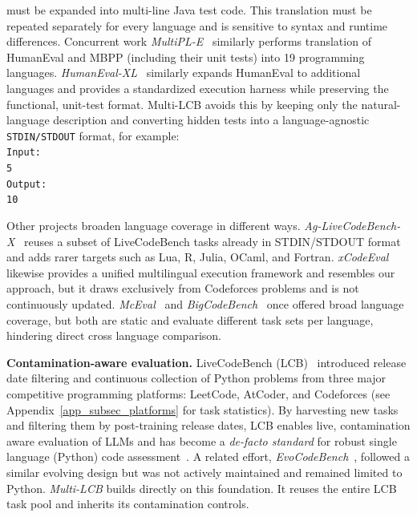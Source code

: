 \documentclass{article} %
\begin{document}
must be expanded into multi-line Java test code. This translation must be repeated separately for every language and is sensitive to syntax and runtime differences. Concurrent work \textit{MultiPL-E}~\citep{cassano2023multipl} similarly performs  translation of HumanEval and MBPP (including their unit tests) into 19 programming languages. \textit{HumanEval-XL}~\citep{peng2024humaneval} similarly expands HumanEval to additional languages and provides a standardized execution harness while preserving the functional, unit-test format. Multi-LCB avoids this by keeping only the natural-language description and converting hidden tests into a language-agnostic \texttt{STDIN/STDOUT}
 format, for example: \texttt{
\noindent{}\\
 \color{blue}Input:\\
\color{black}5\\
 \color{blue}Output:\\
\color{black}10}

Other projects broaden language coverage in different ways. \textit{Ag-LiveCodeBench-X}~\citep{boruch2025agnostics} reuses a subset of LiveCodeBench tasks already in STDIN/STDOUT format and adds rarer targets such as Lua, R, Julia, OCaml, and Fortran. 
\textit{xCodeEval}~\citep{khan2023xcodeeval} likewise provides a unified multilingual execution framework and resembles our approach, but it draws exclusively from Codeforces problems and is not continuously updated. 
\textit{McEval}~\citep{chai2024mceval} and \textit{BigCodeBench}~\citep{zhuo2024bigcodebench} once offered broad language coverage, but both are static and evaluate different task sets per language, hindering direct cross language comparison.


\textbf{Contamination-aware evaluation.} LiveCodeBench (LCB)~\citep{jain2024livecodebench} introduced release date filtering and continuous collection of Python problems from three major competitive programming platforms: LeetCode, AtCoder, and Codeforces (see Appendix~\ref{app_subsec_platforms} for task statistics).  
By harvesting new tasks and filtering them by post-training release dates, LCB enables live, contamination aware evaluation of LLMs and has become a \textit{de-facto standard} for robust single language (Python) code assessment~\citep{comanici2025gemini, yang2025qwen3, liu2024deepseek}. A related effort, \textit{EvoCodeBench}~\citep{li2024evocodebench}, followed a similar evolving design but was not actively maintained and remained limited to Python.
\textit{Multi-LCB} builds directly on this foundation. It reuses the entire LCB~\citep{jain2024livecodebench} task pool and inherits its contamination controls. %
\end{document}
